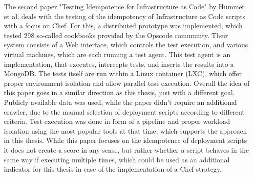 The second paper "Testing Idempotence for Infrastructure as Code" \cite{idempotence} by Hummer et al. deals with the testing of the idempotency of Infrastructure as Code scripts with a focus on Chef. For this, a distributed prototype was implemented, which tested 298 so-called cookbooks provided by the Opscode community. Their system consists of a Web interface, which controls the test execution, and various virtual machines, which are each running a test agent. This test agent is an implementation, that executes, intercepts tests, and inserts the results into a MongoDB. The tests itself are run within a Linux container (LXC), which offer proper environment isolation and allow parallel test execution. Overall the idea of this paper goes in a similar direction as this thesis, just with a different goal. Publicly available data was used, while the paper didn't require an additional crawler, due to the manual selection of deployment scripts according to different criteria. Test execution was done in form of a pipeline and proper workload isolation using the most popular tools at that time, which supports the approach in this thesis. While this paper focuses on the idempotence of deployment scripts it does not create a score in any sense, but rather whether a script behaves in the same way if executing multiple times, which could be used as an additional indicator for this thesis in case of the implementation of a Chef strategy.

